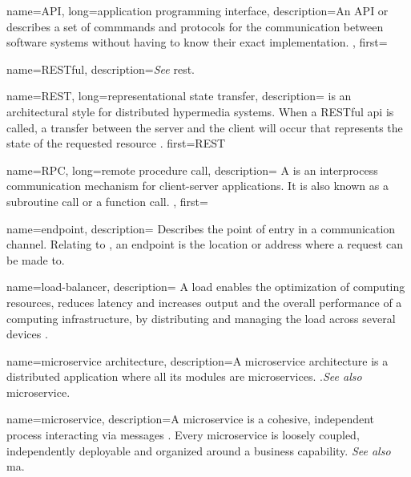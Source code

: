 {
    name=API,
    long={application programming interface},
    description={An API or  describes a set of commmands and
    protocols for the communication between software systems without having to
    know their exact implementation. },
    first=
}

{
    name=RESTful,
    description={\textit{See} \gls{rest}.}
}

{
    name=REST,
    long={representational state transfer},
    description={
     is an architectural style for distributed hypermedia
    systems. When a RESTful \gls{api} is called, a transfer between the server
    and the client will occur that represents the state of the requested
    resource \autocite{Avraham_2017}.
    }
    first=REST %
}

{
    name=RPC,
    long={remote procedure call},
    description={
    A  is an interprocess communication mechanism for
    client-server applications. It is also known as a subroutine call or a
    function call. 
    },
    first= %
}

{
    name=endpoint,
    description={
    Describes the point of entry in a communication channel. Relating to
    , an endpoint is the location or address where a request can
    be made to.
    }
}

{
    name=load-balancer, 
    description={
    A load enables the optimization of computing resources,
    reduces latency and increases output and the overall performance of a
    computing infrastructure, by distributing and managing the load across
    several devices \autocite{Techopedia_2012}.
    }
}

{
    name={microservice architecture},
    description={A microservice architecture is a distributed application where
    all its modules are microservices. \autocite{Dragoni_etal_2017}.\textit{See
    also} \gls{microservice}.}
}

{
    name=microservice,
    description={A microservice is a cohesive, independent process interacting
    via messages \autocite{Dragoni_etal_2017}. Every microservice is loosely
    coupled, independently deployable and organized around a business
    capability. \textit{See also} \gls{ma}.} 
}

